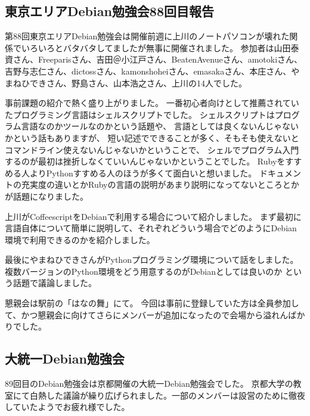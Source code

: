 \documentclass[mingoth,a4paper]{jsarticle}
\begin{document}
\subsection{東京エリアDebian勉強会88回目報告}


第88回東京エリアDebian勉強会は開催前週に上川のノートパソコンが壊れた関係でいろいろとバタバタしてましたが無事に開催されました。
参加者は山田泰資さん、Freeparisさん、吉田＠小江戸さん、BeatenAvenueさん、amotokiさん、
吉野与志仁さん、dictossさん、kamonshoheiさん、emasakaさん、本庄さん、やまねひできさん、野島さん、山本浩之さん、上川の14人でした。

事前課題の紹介で熱く盛り上がりました。
一番初心者向けとして推薦されていたプログラミング言語はシェルスクリプトでした。
シェルスクリプトはプログラム言語なのかツールなのかという話題や、
言語としては良くないんじゃないかという話もありますが、
短い記述でできることが多く、そもそも使えないとコマンドライン使えないんじゃないかということで、
シェルでプログラム入門するのが最初は挫折しなくていいんじゃないかということでした。
Rubyをすすめる人よりPythonすすめる人のほうが多くて面白いと想いました。
ドキュメントの充実度の違いとかRubyの言語の説明があまり説明になってないところとか
が話題になりました。

上川がCoffeescriptをDebianで利用する場合について紹介しました。
まず最初に言語自体について簡単に説明して、それぞれどういう場合でどのようにDebian
環境で利用できるのかを紹介しました。

最後にやまねひできさんがPythonプログラミング環境について話をしました。
複数バージョンのPython環境をどう用意するのがDebianとしては良いのか
という話題で議論しました。

懇親会は駅前の「はなの舞」にて。
今回は事前に登録していた方は全員参加して、かつ懇親会に向けてさらにメンバーが追加になったので会場から溢れんばかりでした。

\subsection{大統一Debian勉強会}

89回目のDebian勉強会は京都開催の大統一Debian勉強会でした。
京都大学の教室にて白熱した議論が繰り広げられました。一部のメンバーは設営のために徹夜していたようでお疲れ様でした。

\end{document}
